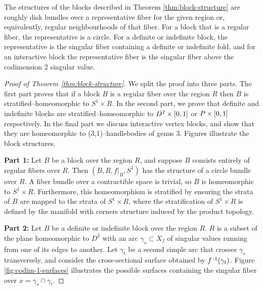 \begin{rmk}
	The structures of the blocks described in Theorem \ref{thm:block-structure} are roughly disk bundles over a representative fiber for the given region or, equivalently, regular neighbourhoods of that fiber.
	For a block that is a regular fiber, the representative is a circle.
	For a definite or indefinite block, the representative is the singular fiber containing a definite or indefinite fold, and for an interactive block the representative fiber is the singular fiber above the codimension 2 singular value.
\end{rmk}

\begin{proof}[Proof of Theorem \ref{thm:block-structure}]
	We split the proof into three parts.
	The first part proves that if a block $B$ is a regular fiber over the region $R$ then $B$ is stratified--homeomorphic to $S^1\times R$.
	In the second part, we prove that definite and indefinite blocks are stratified--homeomorphic to $D^2\times[0,1]$ or $P\times[0,1]$ respectively.
	In the final part we discuss interactive vertex blocks, and show that they are homeomorphic to (3,1)--handlebodies of genus 3.
	Figures illustrate the block structures.
	
	\textbf{Part 1:}
	Let $B$ be a block over the region $R$, and suppose $B$ consists entirely of regular fibers over $R$.
	Then $(B, R, f|_B, S^1)$ has the structure of a circle bundle over $R$.
	A fiber bundle over a contractible space is trivial, so $B$ is homeomorphic to $S^1 \times R$.
	Furthermore, this homeomorphism is stratified by ensuring the strata of $B$ are mapped to the strata of $S^1 \times R$, where the stratification of $S^1 \times R$ is defined by the manifold with corners structure induced by the product topology.
	
%	
	\textbf{Part 2:}
	Let $B$ be a definite or indefinite block over the region $R$.
	$R$ is a subset of the plane homeomorphic to $D^2$ with an arc $\gamma_s \subset X_f$ of singular values running from one of its edges to another.
	Let $\gamma_t$ be a second simple arc that crosses $\gamma_s$ transversely, and consider the cross-sectional surface obtained by $f^{\,\text{-}1}(\gamma_t)$.
	Figure \ref{fig:codim-1-surfaces} illustrates the possible surfaces containing the singular fiber over $x=\gamma_s\cap\gamma_t$.
	

\end{proof}
